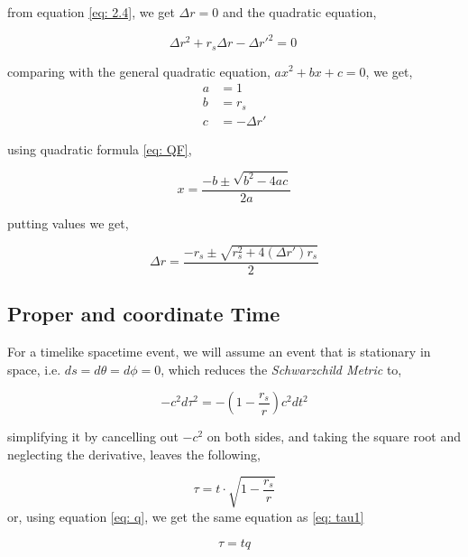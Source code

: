 \documentclass[9pt,a4paper,twocolumn,twoside]{tau-class/tau}
\begin{document}
  from equation \eqref{eq: 2.4}, we get \(\Delta r = 0\) and the quadratic equation, 

  \begin{equation*} \label{eq: 2.5}
    \Delta r^2 + r_s\Delta r - \Delta r'^{2} = 0 \tag{2.5}\
  \end{equation*}

  comparing with the general quadratic equation, \(ax^2 + bx + c = 0\), we get, 
  \begin{align*}
    a &= 1 \\
    b &= r_s \\ 
    c &= -\Delta r'
  \end{align*}

  using quadratic formula \eqref{eq: QF}, 

  \begin{equation} \label{eq: QF}
    x = \frac{-b \pm \sqrt{b^2 - 4ac}}{2a} \tag{QF}
  \end{equation}

  putting values we get, 

  \begin{equation} \label{eq: dr}
    \Delta r = \frac{-r_s \pm \sqrt{r_s^2 + 4(\Delta r')r_s}}{2} \tag{2.6}
  \end{equation}

  \subsection*{Proper and coordinate Time}

  For a timelike spacetime event, we will assume an event that is stationary in space, i.e. \(ds = d\theta = d\phi = 0\), which reduces the \emph{Schwarzchild Metric} to,

  \begin{equation} \label{eq: pt}
    -c^2d\tau^{2} = - (1 - \frac{r_s}{r}) c^2 dt^2 \tag{2.7}
  \end{equation}

  simplifying it by cancelling out \(-c^2\) on both sides, and taking the square root and neglecting the derivative, leaves the following, 

  \begin{equation} \label{eq: pt2}
    \tau = t \cdot \sqrt{1 - \frac{r_s}{r}} \tag{2.8}
  \end{equation}
  or, using equation \eqref{eq: q}, we get the same equation as \eqref{eq: tau1}

  \begin{equation} \label{eq:Tau2}
    \tau = tq \tag{2.9}
  \end{equation}
\end{document}
